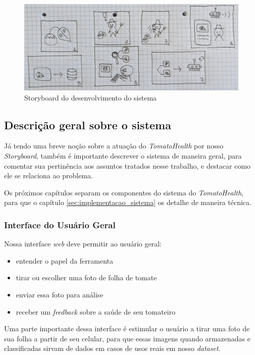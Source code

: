\begin{figure}[ht]
    \centering
    \includegraphics[width=\textwidth]{images/storyboard.jpg}
    \caption{Storyboard do desenvolvimento do sistema}
    \label{fig:storyboard}
\end{figure}

\subsection{{Descrição geral sobre o sistema}}

Já tendo uma breve noção sobre a atuação do \emph{TomatoHealth} por nosso \textit{Storyboard}, também é importante descrever o sistema de maneira geral, para comentar sua pertinência aos assuntos tratados nesse trabalho, e destacar como ele se relaciona ao problema.

Os próximos capítulos separam os componentes do sistema do \emph{TomatoHealth}, para que o capítulo \ref{sec:implementacao_sistema} os detalhe de maneira técnica.

\subsubsection{{Interface do Usuário Geral} \label{sec:abst-geral}}

Nossa interface \textit{web} deve permitir ao usuário geral:

\begin{itemize}
    \item entender o papel da ferramenta
    \item tirar ou escolher uma foto de folha de tomate
    \item enviar essa foto para análise
    \item receber um \textit{feedback} sobre a saúde de seu tomateiro
\end{itemize}

Uma parte importante dessa interface é estimular o usuário a tirar uma foto de sua folha a partir de seu celular, para que essas imagens quando armazenadas e classificadas sirvam de dados em casos de usos reais em nosso \textit{dataset}.

